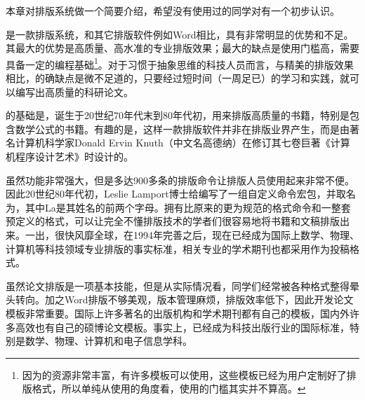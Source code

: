 

本章对排版系统做一个简要介绍，希望没有使用过的同学对有一个初步认识。


是一款排版系统，和其它排版软件例如Word相比，具有非常明显的优势和不足。其最大的优势是高质量、高水准的专业排版效果；最大的缺点是使用门槛高，需要具备一定的编程基础\footnote{因为的资源非常丰富，有许多模板可以使用，这些模板已经为用户定制好了排版格式，所以单纯从使用的角度看，使用的门槛其实并不算高。}。对于习惯于抽象思维的科技人员而言，与精美的排版效果相比，的确缺点是微不足道的，只要经过短时间（一周足已）的学习和实践，就可以编写出高质量的科研论文。

的基础是，诞生于20世纪70年代末到80年代初，用来排版高质量的书籍，特别是包含数学公式的书籍。有趣的是，这样一款排版软件并非在排版业界产生，而是由著名计算机科学家Donald Ervin Knuth（中文名高德纳）在修订其七卷巨著《计算机程序设计艺术》时设计的。

虽然功能非常强大，但是多达900多条的排版命令让排版人员使用起来非常不便。因此20世纪80年代初，Leslie Lamport博士给编写了一组自定义命令宏包，并取名为，其中La是其姓名的前两个字母。拥有比原来的更为规范的格式命令和一整套预定义的格式，可以让完全不懂排版技术的学者们很容易地将书籍和文稿排版出来。一出，很快风靡全球，在1994年完善之后，现在已经成为国际上数学、物理、计算机等科技领域专业排版的事实标准，相关专业的学术期刊也都采用作为投稿格式。


虽然论文排版是一项基本技能，但是从实际情况看，同学们经常被各种格式整得晕头转向。加之Word排版不够美观，版本管理麻烦，排版效率低下，因此开发论文模板非常重要。国际上许多著名的出版机构和学术期刊都有自己的模板，国内外许多高效也有自己的硕博论文模板。事实上，已经成为科技出版行业的国际标准，特别是数学、物理、计算机和电子信息学科。

